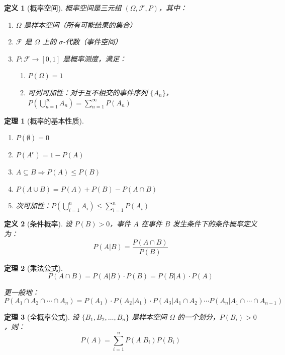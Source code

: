 \documentclass[12pt]{article}
\newtheorem{theorem}{定理}[section]
\newtheorem{definition}{定义}[section]
\begin{document}
\begin{definition}[概率空间]
概率空间是三元组 $(\Omega, \mathcal{F}, P)$，其中：
\begin{enumerate}
\item $\Omega$ 是样本空间（所有可能结果的集合）
\item $\mathcal{F}$ 是 $\Omega$ 上的 $\sigma$-代数（事件空间）
\item $P: \mathcal{F} \to [0, 1]$ 是概率测度，满足：
    \begin{enumerate}
    \item $P(\Omega) = 1$
    \item 可列可加性：对于互不相交的事件序列 $\{A_n\}$，$P(\bigcup_{n=1}^{\infty} A_n) = \sum_{n=1}^{\infty} P(A_n)$
    \end{enumerate}
\end{enumerate}
\end{definition}

\begin{theorem}[概率的基本性质]
\begin{enumerate}
\item $P(\emptyset) = 0$
\item $P(A^c) = 1 - P(A)$
\item $A \subseteq B \Rightarrow P(A) \leq P(B)$
\item $P(A \cup B) = P(A) + P(B) - P(A \cap B)$
\item 次可加性：$P(\bigcup_{i=1}^{n} A_i) \leq \sum_{i=1}^{n} P(A_i)$
\end{enumerate}
\end{theorem}

\begin{definition}[条件概率]
设 $P(B) > 0$，事件 $A$ 在事件 $B$ 发生条件下的条件概率定义为：
$$P(A|B) = \frac{P(A \cap B)}{P(B)}$$
\end{definition}

\begin{theorem}[乘法公式]
$$P(A \cap B) = P(A|B) \cdot P(B) = P(B|A) \cdot P(A)$$

更一般地：
$$P(A_1 \cap A_2 \cap \cdots \cap A_n) = P(A_1) \cdot P(A_2|A_1) \cdot P(A_3|A_1 \cap A_2) \cdots P(A_n|A_1 \cap \cdots \cap A_{n-1})$$
\end{theorem}

\begin{theorem}[全概率公式]
设 $\{B_1, B_2, \ldots, B_n\}$ 是样本空间 $\Omega$ 的一个划分，$P(B_i) > 0$，则：
$$P(A) = \sum_{i=1}^{n} P(A|B_i) P(B_i)$$
\end{theorem}
\end{document}
